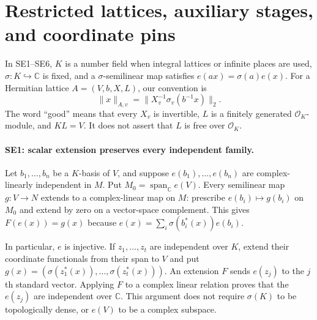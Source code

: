 \section{Restricted lattices, auxiliary stages, and coordinate pins}
\label{sec:stage-existence}


In SE1--SE6, $K$ is a number field when integral lattices or infinite
places are used, $\sigma:K\hookrightarrow\mathbb C$ is fixed, and a
$\sigma$-semilinear map satisfies $e(ax)=\sigma(a)e(x)$.
For a Hermitian lattice $A=(V,b,X,L)$, our convention is
\[
 \|x\|_{A,v}=\|X_v^{-1}\sigma_v(b^{-1}x)\|_2.
 \tag{SE.1}
\]
The word ``good'' means that every $X_v$ is invertible, $L$ is a finitely
generated $\mathcal O_K$-module, and $KL=V$. It does not assert that $L$
is free over $\mathcal O_K$.

\paragraph{SE1: scalar extension preserves every independent family.}
Let $b_1,\ldots,b_n$ be a $K$-basis of $V$, and suppose
$e(b_1),\ldots,e(b_n)$ are complex-linearly independent in $M$.
Put $M_0=\operatorname{span}_{\mathbb C}e(V)$. Every semilinear map
$g:V\to N$ extends to a complex-linear map on $M$: prescribe
$e(b_i)\mapsto g(b_i)$ on $M_0$ and extend by zero on a vector-space
complement. This gives $F(e(x))=g(x)$ because
$e(x)=\sum_i\sigma(b_i^*(x))e(b_i)$.

In particular, $e$ is injective. If $z_1,\ldots,z_t$ are independent over
$K$, extend their coordinate functionals from their span to $V$ and put
$g(x)=(\sigma(z_1^*(x)),\ldots,\sigma(z_t^*(x)))$.
An extension $F$ sends $e(z_j)$ to the $j$th standard vector. Applying
$F$ to a complex linear relation proves that the $e(z_j)$ are independent
over $\mathbb C$. This argument does not require $\sigma(K)$ to be
topologically dense, or $e(V)$ to be a complex subspace.

